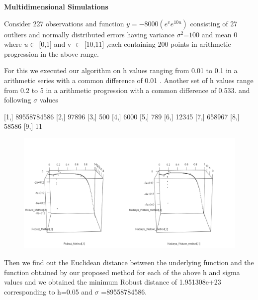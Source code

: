 \documentclass[11pt]{article}
\begin{document}
\begin{flushleft}
 
 \vspace{0.1in}
 \textbf{Multidimensional Simulations}
\vspace{0.1in}

Consider 227 observations and function  $y=-8000(e^{v}e^{10u})$  consisting of 27 outliers  and  normally distributed errors having variance $\sigma^2$=$100$ and mean 0  where  $u \in$  [0,1] and v $\in$ [10,11] ,each containing 200 points in arithmetic progression in the above range.\\
 

\vspace{0.1in}


For this we executed our algorithm on h values ranging from 0.01 to 0.1 in a arithmetic series with a common difference of 0.01 . Another set of h values range from 0.2 to 5 in a arithmetic progression with a common difference of 0.533.
\vspace{0.1in}
and following $\sigma$ values 


 [1,] 89558784586
 [2,]       97896
 [3,]         500
 [4,]        6000
 [5,]         789
 [6,]       12345
 [7,]      658967
 [8,]       58586
 [9,]          11



\begin{figure}[ht]
\begin{center}
\includegraphics[scale=0.4]{4}

\end{center}
\end{figure}

 Then we find out the Euclidean distance between the underlying  function and the function obtained by our proposed method for each of the above h and sigma values and we obtained the minimum Robust distance of  1.951308e+23  corresponding to h=0.05 and $\sigma$ =89558784586.
 

\end{flushleft}
\end{document}
